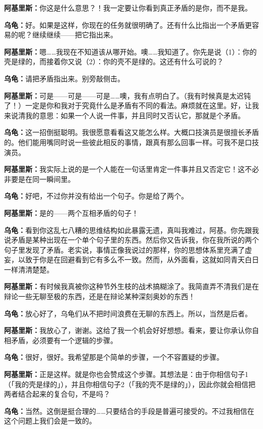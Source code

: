 \documentclass[
  12pt,
  twoside,
  openright,
  oldfontcommands,
]{memoir}
\newcommand{\dialogname}[1]{{\heifamily\bfseries #1}}
\begin{document}
\dialogname{阿基里斯：}你这是什么意思？！我一定要让你看到真正矛盾的是你，而不是我。

\dialogname{乌龟：}好。如果是这样，你现在的任务就很明确了。还有什么比指出一个矛盾更容易的呢？继续继续------把它指出来。

\dialogname{阿基里斯：}嗯\ldots\ldots 我现在不知道该从哪开始。噢\ldots\ldots 我知道了。你先是说（1）：你的壳是绿的，而接着你又说（2）：你的壳不是绿的。这还有什么可说的？

\dialogname{乌龟：}请把矛盾指出来。别旁敲侧击。

\dialogname{阿基里斯：}可是------可是------可是\ldots\ldots 噢，我有点明白了。（我有时候真是太迟钝了！）一定是你和我对于究竟什么是矛盾有不同的看法。麻烦就在这里。好，让我来说清我的意思：如果一个人说一件事，并且同时又否认它，那就是个矛盾。

\dialogname{乌龟：}这一招倒挺聪明。我很愿意看看这又能怎么样。大概口技演员是很擅长矛盾的。他们能用嘴同时说一些彼此相反的事情，跟真有那么回事一样。可我不是口技演员。

\dialogname{阿基里斯：}我实际上说的是一个人能在一句话里肯定一件事并且又否定它！这不必非要是在同一瞬间里。

\dialogname{乌龟：}好吧，不过你并没有给出一个句子。你是给了两个。

\dialogname{阿基里斯：}是的------两个互相矛盾的句子！

\dialogname{乌龟：}看到你这乱七八糟的思维结构如此暴露无遗，真叫我难过，阿基。你先跟我说矛盾是某种出现在一个单个句子里的东西。然后你又告诉我，你在我所说的两个句子里发现了矛盾。老实说，事情正像我说过的那样，你的思想体系里充满了虚妄，以致于你是在回避看到它有多么不一致。然而，从外面看，这就如同青天白日一样清清楚楚。

\dialogname{阿基里斯：}有时候我真被你这种节外生枝的战术搞糊涂了。我简直弄不清我们是在辩论一些无聊至极的东西，还是在辩论某种深刻奥妙的东西！

\dialogname{乌龟：}放心好了，乌龟们从不把时间浪费在无聊的东西上。所以，当然是后者。

\dialogname{阿基里斯：}我放心了，谢谢。这给了我一个机会好好想想。看来，要让你承认你自相矛盾，必须要有一个逻辑的步骤。

\dialogname{乌龟：}很好，很好。我希望那是个简单的步骤，一个不容置疑的步骤。

\dialogname{阿基里斯：}正是这样。就是你也会赞成这个步骤。其想法是：由于你相信句子1（「我的壳是绿的」），并且你相信句子2（「我的壳不是绿的」），因此你就会相信把两者结合起来的复合句，不是吗？

\dialogname{乌龟：}当然。这倒是挺合理的\ldots\ldots 只要结合的手段是普遍可接受的。不过我相信在这个问题上我们会是一致的。
\end{document}
